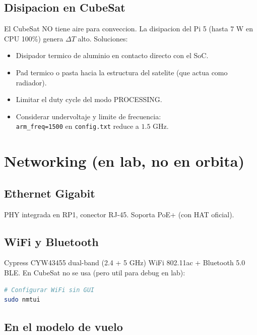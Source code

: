 \documentclass[11pt,a4paper,oneside]{report}
\begin{document}
\section{Disipacion en CubeSat}

\begin{cuidado}
El CubeSat NO tiene aire para conveccion. La disipacion del Pi 5 (hasta $7$
W en CPU 100\%) genera $\Delta T$ alto. Soluciones:
\begin{itemize}[leftmargin=1em]
  \item Disipador termico de aluminio en contacto directo con el SoC.
  \item Pad termico o pasta hacia la estructura del satelite (que actua como
        radiador).
  \item Limitar el duty cycle del modo PROCESSING.
  \item Considerar undervoltaje y limite de frecuencia: \\
        \texttt{arm\_freq=1500} en \texttt{config.txt} reduce a $1.5$ GHz.
\end{itemize}
\end{cuidado}

\chapter{Networking (en lab, no en orbita)}

\section{Ethernet Gigabit}

PHY integrada en RP1, conector RJ-45. Soporta PoE+ (con HAT oficial).

\section{WiFi y Bluetooth}

Cypress CYW43455 dual-band (2.4 + 5 GHz) WiFi 802.11ac + Bluetooth 5.0 BLE.
En CubeSat no se usa (pero util para debug en lab):

\begin{lstlisting}[language=bash]
# Configurar WiFi sin GUI
sudo nmtui
\end{lstlisting}

\section{En el modelo de vuelo}
\end{document}
